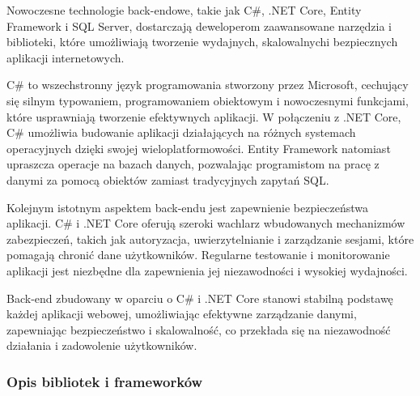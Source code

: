  Nowoczesne technologie back-endowe, takie jak C\#, .NET Core, Entity Framework i SQL Server, dostarczają deweloperom zaawansowane narzędzia i biblioteki, które umożliwiają tworzenie wydajnych, skalowalnych\linebreak i bezpiecznych aplikacji internetowych.

C\# to wszechstronny język programowania stworzony przez Microsoft, cechujący się silnym typowaniem, programowaniem obiektowym i nowoczesnymi funkcjami, które usprawniają tworzenie efektywnych aplikacji. W połączeniu z .NET Core, C\# umożliwia budowanie aplikacji działających na różnych systemach operacyjnych dzięki swojej wieloplatformowości. Entity Framework natomiast upraszcza operacje na bazach danych, pozwalając programistom na pracę z danymi za pomocą obiektów zamiast tradycyjnych zapytań SQL.

Kolejnym istotnym aspektem back-endu jest zapewnienie bezpieczeństwa aplikacji. C\# i .NET Core oferują szeroki wachlarz wbudowanych mechanizmów zabezpieczeń, takich jak autoryzacja, uwierzytelnianie i zarządzanie sesjami, które pomagają chronić dane użytkowników. Regularne testowanie i monitorowanie aplikacji jest niezbędne dla zapewnienia jej niezawodności i wysokiej wydajności.

Back-end zbudowany w oparciu o C\# i .NET Core stanowi stabilną podstawę każdej aplikacji webowej, umożliwiając efektywne zarządzanie danymi, zapewniając bezpieczeństwo i skalowalność, co przekłada się na niezawodność działania i zadowolenie użytkowników.
\subsubsection{Opis bibliotek i frameworków}

